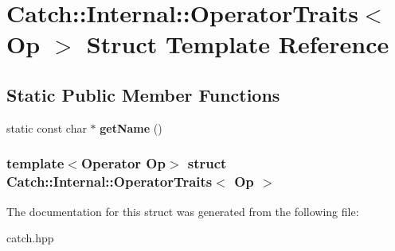 \hypertarget{structCatch_1_1Internal_1_1OperatorTraits}{
\section{Catch::Internal::OperatorTraits$<$ Op $>$ Struct Template Reference}
\label{structCatch_1_1Internal_1_1OperatorTraits}
}
\subsection*{Static Public Member Functions}
\begin{DoxyCompactItemize}
\item 
\hypertarget{structCatch_1_1Internal_1_1OperatorTraits_ac6d08082ea33348d42bc4ccbd6d07671}{
static const char $\ast$ {\bfseries getName} ()}
\label{structCatch_1_1Internal_1_1OperatorTraits_ac6d08082ea33348d42bc4ccbd6d07671}

\end{DoxyCompactItemize}
\subsubsection*{template$<$Operator Op$>$ struct Catch::Internal::OperatorTraits$<$ Op $>$}



The documentation for this struct was generated from the following file:\begin{DoxyCompactItemize}
\item 
catch.hpp\end{DoxyCompactItemize}
